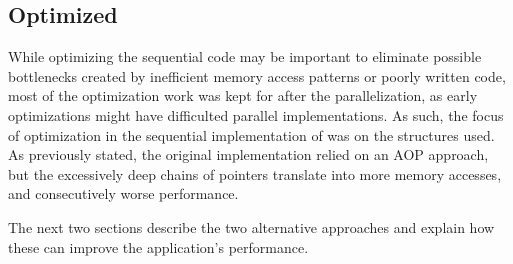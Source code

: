 \subsection{Optimized}

While optimizing the sequential code may be important to eliminate possible bottlenecks created by inefficient memory access patterns or poorly written code, most of the optimization work was kept for after the parallelization, as early optimizations might have difficulted parallel implementations. As such, the focus of optimization in the sequential implementation of \polu was on the structures used. As previously stated, the original implementation relied on an AOP approach, but the excessively deep chains of pointers translate into more memory accesses, and consecutively worse performance.

The next two sections describe the two alternative approaches and explain how these can improve the application's performance.



